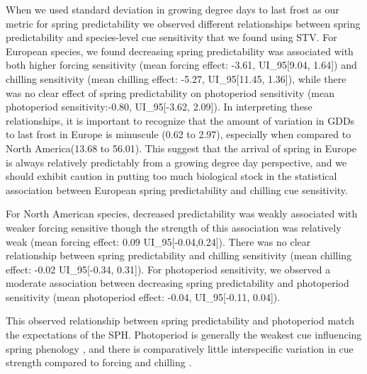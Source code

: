 \documentclass[12pt]{article}
\begin{document}
When we used standard deviation in growing degree days to last frost as our metric for spring predictability we observed different relationships between spring predictability and species-level cue sensitivity that we found using STV. For European species, we found decreasing spring predictability was associated with both higher forcing sensitivity (mean forcing effect: -3.61, UI_{95}[9.04, 1.64]) and chilling sensitivity (mean chilling effect: -5.27, UI_{95}[11.45, 1.36]), while there was no clear effect of spring predictability on photoperiod sensitivity (mean photoperiod sensitivity:-0.80, UI_{95}[-3.62, 2.09]). In interpreting these relationships, it is important to recognize that the amount of variation in GDDs to last frost in Europe is minuscule (0.62 to 2.97), especially when compared to North America(13.68 to 56.01). This suggest that the arrival of spring in Europe is always relatively predictably from a growing degree day perspective, and we should exhibit caution in putting too much biological stock in the statistical association between European spring predictability and chilling cue sensitivity.

For North American species, decreased predictability was weakly associated with weaker forcing sensitive though the strength of this association was relatively weak (mean forcing effect: 0.09 UI_{95}[-0.04,0.24]). There was no clear relationship between spring predictability and chilling sensitivity (mean chilling effect: -0.02 UI_{95}[-0.34, 0.31]). For photoperiod sensitivity, we observed a moderate association between decreasing spring predictability and photoperiod sensitivity (mean photoperiod effect: -0.04, UI_{95}[-0.11, 0.04]). 

This observed relationship between spring predictability and photoperiod match the expectations of the SPH. Photoperiod is generally the weakest cue influencing spring phenology \citep{Ettinger:2020aa}, and there is comparatively little interspecific variation in cue strength compared to forcing and chilling \citep{Nacho}. 
\end{document}
